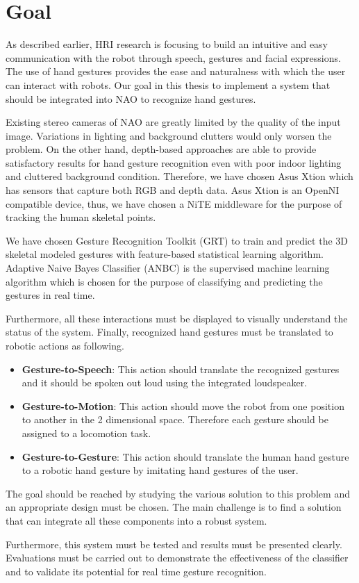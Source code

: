 \chapter{Goal} As described earlier, HRI research is focusing to build an intuitive and easy communication with the robot through speech, gestures and facial expressions. The use of hand gestures provides the ease and naturalness with which the user can interact with robots. Our goal in this thesis to implement a system that should be integrated into NAO to recognize hand gestures. 

Existing stereo cameras of NAO are greatly limited by the quality of the input image. Variations in lighting and background clutters would only worsen the problem. On the other hand, depth-based approaches are able to provide satisfactory results for hand gesture recognition even with poor indoor lighting and cluttered background condition. Therefore, we have chosen Asus Xtion which has sensors that capture both RGB and depth data. Asus Xtion is an OpenNI compatible device, thus, we have chosen a NiTE middleware for the purpose of tracking the human skeletal points. 

We have chosen Gesture Recognition Toolkit (GRT) to train and predict the 3D skeletal modeled gestures with feature-based statistical learning algorithm. Adaptive Naive Bayes Classifier (ANBC) is the supervised machine learning algorithm which is chosen for the purpose of classifying and predicting the gestures in real time.

Furthermore, all these interactions must be displayed to visually understand the status of the system. Finally, recognized hand gestures must be translated to robotic actions as following.

\begin{itemize}	
	\item \textbf{Gesture-to-Speech}: This action should translate the recognized gestures and it should be spoken out loud using the integrated loudspeaker.
	
	\item \textbf{Gesture-to-Motion}: This action should move the robot from one position to another in the 2 dimensional space. Therefore each gesture should be assigned to a locomotion task.
	
	\item \textbf{Gesture-to-Gesture}: This action should translate the human hand gesture to a robotic hand gesture by imitating hand gestures of the user. 
\end{itemize}

The goal should be reached by studying the various solution to this problem and an appropriate design must be chosen. The main challenge is to find a solution that can integrate all these components into a robust system.

Furthermore, this system must be tested and results must be presented clearly. Evaluations must be carried out to  demonstrate the effectiveness of the classifier and to validate its potential for real time gesture recognition.